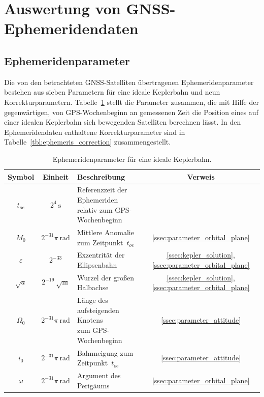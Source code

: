\documentclass[10pt,a4paper]{article}
\begin{document}
\section{Auswertung von GNSS-Ephemeridendaten}

\subsection{Ephemeridenparameter}

Die von den betrachteten GNSS-Satelliten übertragenen Ephemeridenparameter bestehen aus sieben Parametern für eine ideale Keplerbahn und neun Korrekturparametern. 
Tabelle~\ref{tbl:ephemeris_kepler} stellt die Parameter zusammen, die mit Hilfe der gegenwärtigen, von GPS-Wochenbeginn an gemessenen Zeit die Position eines auf einer idealen Keplerbahn sich bewegenden Satelliten berechnen lässt.
In den Ephemeridendaten enthaltene Korrekturparameter sind in Tabelle~\ref{tbl:ephemeris_correction} zusammengestellt.

\begin{table}
\caption{\label{tbl:ephemeris_kepler} Ephemeridenparameter \cite{groves_2013} für eine ideale Keplerbahn.}
\centering

\begin{tabular}{|c|c|l|c|}
\hline
Symbol & Einheit & Beschreibung & Verweis \\
\hline
$t_{oe}$ & $2^4\ \mathrm{s}$ &
\parbox[t]{5cm}{Referenzzeit der Ephemeriden \\ relativ zum GPS-Wochenbeginn}
  & \\
$M_{0}$ & $2^{-31}\pi\ \mathrm{rad}$ & Mittlere Anomalie zum Zeitpunkt~$t_{oe}$ & \ref{ssec:parameter_orbital_plane} \\
$\varepsilon$ & $2^{-33}$ & Exzentrität der Ellipsenbahn & \ref{ssec:kepler_solution}, \ref{ssec:parameter_orbital_plane} \\
$\sqrt{a}$ & $2^{-19}\ \sqrt{\mathrm{m}}$ & Wurzel der großen Halbachse & \ref{ssec:kepler_solution}, \ref{ssec:parameter_orbital_plane} \\
$\Omega_0$ & $2^{-31}\pi\ \mathrm{rad}$ & 
\parbox[t]{5cm}{Länge des aufsteigenden Knotens \\ zum GPS-Wochenbeginn}  & \ref{ssec:parameter_attitude} \\
$i_0$ & $2^{-31}\pi\ \mathrm{rad}$ & Bahnneigung zum Zeitpunkt~$t_{oe}$ & \ref{ssec:parameter_attitude} \\
$\omega$ & $2^{-31}\pi\ \mathrm{rad}$ & Argument des Perigäums & \ref{ssec:parameter_orbital_plane} \\
\hline
\end{tabular}
\end{table}
\end{document}
